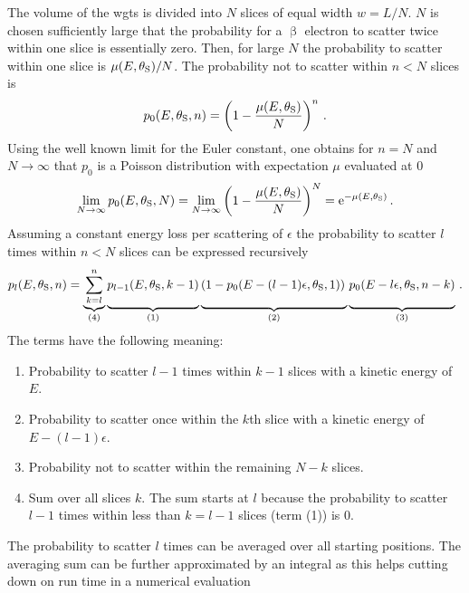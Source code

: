 The volume of the \gls{wgts} is divided into $N$ slices of equal width $w=L/N$. $N$ is chosen sufficiently large that the probability for a $\upbeta$ electron to scatter twice within one slice is essentially zero. Then, for large $N$ the probability to scatter within one slice is $\mu(E,\theta_\mathrm{S})/N$. The probability not to scatter within $n<N$ slices is
\begin{equation}
    p_0(E,\theta_\mathrm{S},n) =
    \left(
        1-\frac{\mu(E,\theta_\mathrm{S})}{N}
    \right)^n
    \text{\,.}
\end{equation}
Using the well known limit for the Euler constant, one obtains for $n=N$ and $N\rightarrow\infty$ that $p_0$ is a Poisson distribution with expectation $\mu$ evaluated at 0 
\begin{align}
    \lim_{N\rightarrow\infty} 
    p_0(E,\theta_\mathrm{S},N) =
    \lim_{N\rightarrow\infty} 
    \left(
        1-\frac{\mu(E,\theta_\mathrm{S})}{N}
    \right)^N =
    \mathrm{e}^{-\mu(E,\theta_\mathrm{S})}
    \text{\,.}
\end{align}
Assuming a constant energy loss per scattering of $\epsilon$ the probability to scatter $l$ times within $n<N$ slices can be expressed recursively
\begin{equation}
    p_l(E,\thetaSource,n) =
    \underbrace{
        \sum_{k=l}^{n}
    }_{(4)}
    \underbrace{
        p_{l-1}(E,\thetaSource,k-1)
        \vphantom{\sum_{k=l}^{n}}
    }_{(1)}
    \underbrace{
    \left(
        1-p_0(E-(l-1)\epsilon,\thetaSource,1)
    \right)
    \vphantom{\sum_{k=l}^{n}}
    }_{(2)}
    \underbrace{
        p_0(E-l\epsilon,\thetaSource,n-k)
        \vphantom{\sum_{k=l}^{n}}
    }_{(3)}
    \fullstop
\end{equation}
The terms have the following meaning:
\begin{enumerate}[(1)]
    \item Probability to scatter $l-1$ times within $k-1$ slices with a kinetic energy of $E$.
    \item Probability to scatter once within the $k$th slice with a kinetic energy of $E-(l-1)\epsilon$.
    \item Probability not to scatter within the remaining $N-k$ slices.
    \item Sum over all slices $k$. The sum starts at $l$ because the probability to scatter $l-1$ times within less than $k=l-1$ slices (term (1)) is 0.
\end{enumerate}
The probability to scatter $l$ times can be averaged over all starting positions. The averaging sum can be further approximated by an integral as this helps cutting down on run time in a numerical evaluation

